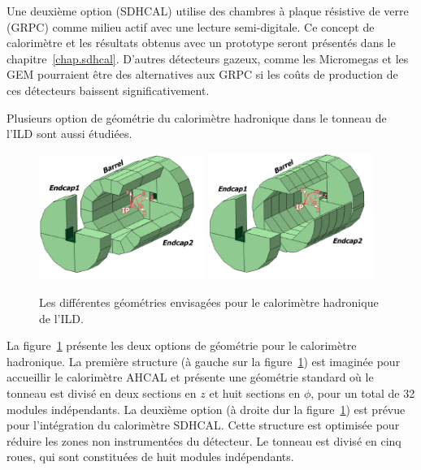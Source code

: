 Une deuxième option (SDHCAL) utilise des chambres à plaque résistive de verre (GRPC) comme milieu actif avec une lecture semi-digitale. Ce concept de calorimètre et les résultats obtenus avec un prototype seront présentés dans le chapitre~\ref{chap.sdhcal}. D'autres détecteurs gazeux, comme les Micromegas et les GEM pourraient être des alternatives aux GRPC si les coûts de production de ces détecteurs baissent significativement. 

Plusieurs option de géométrie du calorimètre hadronique dans le tonneau de l'ILD sont aussi étudiées.
\begin{figure}[!ht]
  \begin{center}
    \includegraphics[width=0.48\textwidth]{ILC/figs/hcal1.png}
    \includegraphics[width=0.48\textwidth]{ILC/figs/hcal2.png}
    \caption{Les différentes géométries envisagées pour le calorimètre hadronique de l'ILD.}
    \label{fig:hcalDesign}
  \end{center}
\end{figure}
La figure~\ref{fig:hcalDesign} présente les deux options de géométrie pour le calorimètre hadronique. La première structure (à gauche sur la figure~\ref{fig:hcalDesign}) est imaginée pour accueillir le calorimètre AHCAL et présente une géométrie standard où le tonneau est divisé en deux sections en $z$ et huit sections en $\phi$, pour un total de 32 modules indépendants. La deuxième option (à droite dur la figure~\ref{fig:hcalDesign}) est prévue pour l'intégration du calorimètre SDHCAL. Cette structure est optimisée pour réduire les zones non instrumentées du détecteur. Le tonneau est divisé en cinq roues, qui sont constituées de huit modules indépendants. 

